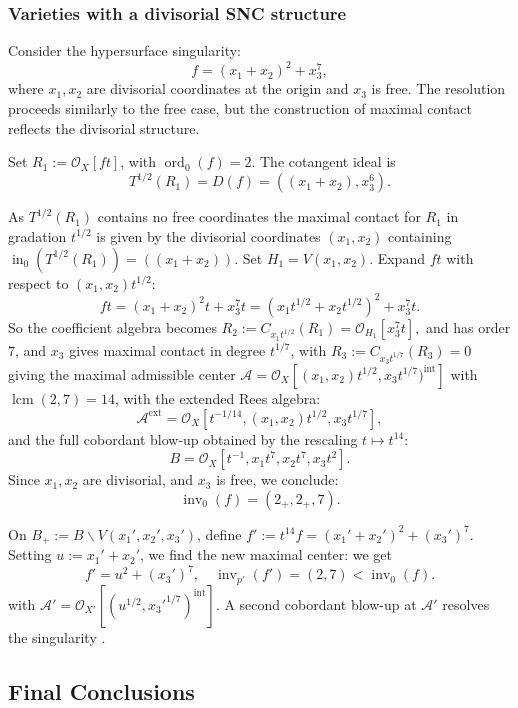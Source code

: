 \documentclass{amsart}
\newcommand{\cA}{{\mathcal A}}
\newcommand{\cJ}{{\mathcal J}}
\newcommand{\cO}{{\mathcal O}}
\newcommand{\ext}{{\operatorname{ext}}}
\newcommand{\inn}{\operatorname{in}}
\newcommand{\lcm}{{\operatorname{lcm}}}
\renewcommand{\setminus}{\smallsetminus}
\newcommand{\ord}{{\operatorname{ord}}}
\newcommand{\inv}{{\operatorname{inv}}}
\newcommand{\inte}{{\operatorname{int}}}
\begin{document}
\subsubsection{Varieties with a divisorial SNC structure}

\begin{example} \label{div2}
Consider the hypersurface singularity:
\[
f = (x_1 + x_2)^2 + x_3^7,
\]
where $x_1, x_2$ are divisorial coordinates at the origin and $x_3$ is free. The resolution proceeds similarly to the free case, but the construction of maximal contact reflects the divisorial structure.

Set $R_1 := \cO_X[ft]$, with $\ord_0(f) = 2$. The cotangent ideal is
\[
T^{1/2}(R_1) = D(f) = ((x_1 + x_2), x_3^6).
\]

As $T^{1/2}(R_1)$ contains no free coordinates the maximal contact for $R_1$ in gradation $t^{1/2}$ is given by the divisorial coordinates $(x_1,x_2)$ containing   $\inn_0(T^{1/2}(R_1))= \left((x_1 + x_2)\right)$. Set $H_1=V(x_1,x_2)$.
Expand $ft$ with respect to $(x_1,x_2)t^{1/2}$:
\[
ft = (x_1 + x_2)^2 t + x_3^7 t = (x_1 t^{1/2}+x_2 t^{1/2})^2 + x_3^7t.
\]
So the coefficient algebra becomes
$
R_2 := C_{x_1t^{1/2}}(R_1) = \cO_{H_1}[x_3^7t],
$
and  has order $7$, and $x_3$ gives maximal contact in degree $t^{1/7}$, with
$
R_3 := C_{x_3t^{1/7}}(R_3) = 0$
giving  
 the maximal admissible center $ \cA=\cO_X[(x_1,x_2)t^{1/2}, x_3t^{1/7})^{\inte}]$ with $\lcm(2,7) = 14$, with  the extended Rees algebra:
\[
\cA^\ext = \cO_X[t^{-1/14}, (x_1,x_2) t^{1/2}, x_3 t^{1/7}],
\]
and the full cobordant blow-up obtained by the rescaling $t\mapsto t^{14}$:
\[
B = \cO_X[t^{-1}, x_1 t^{7}, x_2 t^7, x_3 t^2].
\]
Since $x_1, x_2$ are divisorial, and $x_3$ is free, we conclude:
\[
\inv_0(f) = (2_+, 2_+, 7).
\]

On $B_+ := B \setminus V(x_1', x_2', x_3')$, define $f' := t^{14} f = (x_1' + x_2')^2 + (x_3')^7$. Setting $u := x_1' + x_2'$, we find the new maximal center:
we get
\[
f' = u^2 + (x_3')^7,\quad \inv_{p'}(f') = (2,7) < \inv_0(f).
\]
with
$
\cA' = \cO_{X'}[(u^{1/2}, x_3'^{1/7})^{\inte}].
$
A second cobordant blow-up at $\cA'$ resolves the singularity .


\end{example}
\subsection{Final Conclusions} \label{Final}
\end{document}
